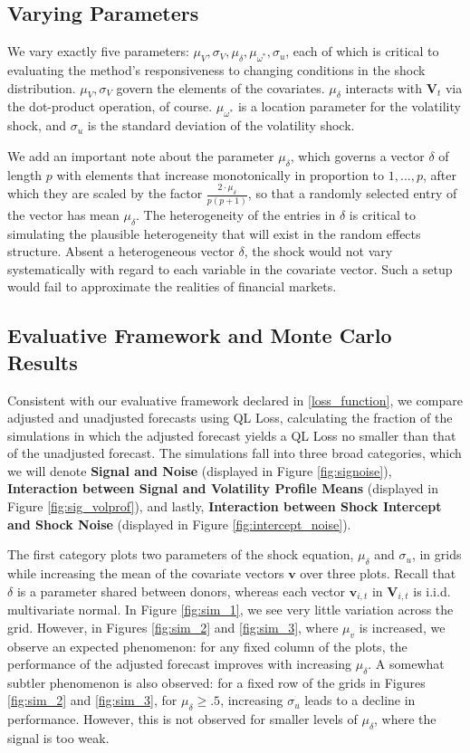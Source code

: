 \documentclass{uiucthesis2021}
\newcommand{\x}{\textbf{v}}
\newcommand{\V}{\textbf{V}}
\theoremstyle{definition}
\begin{document}
  \subsection{Varying Parameters}
  We vary exactly five parameters: $\mu_{V}, \sigma_{V}, \mu_{\delta}, \mu_{\omega^{*}}, \sigma_{u}$, each of which is critical to evaluating the method's responsiveness to changing conditions in the shock distribution. $\mu_{V}, \sigma_{V}$ govern the elements of the covariates. $\mu_{\delta}$ interacts with $\textbf{V}_{t}$ via the dot-product operation, of course.  $\mu_{\omega^{*}}$ is a location parameter for the volatility shock, and $\sigma_{u}$ is the standard deviation of the volatility shock.
  
  We add an important note about the parameter $\mu_{\delta}$, which governs a vector $\delta$ of length $p$ with elements that increase monotonically in proportion to $1,...,p$, after which they are scaled by the factor $\frac{2\cdot\mu_{\delta}}{p(p+1)}$, so that a randomly selected entry of the vector has mean $\mu_{\delta}$.  The heterogeneity of the entries in $\delta$ is critical to simulating the plausible heterogeneity that will exist in the random effects structure.  Absent a heterogeneous vector $\delta$, the shock would not vary systematically with regard to each variable in the covariate vector.  Such a setup would fail to approximate the realities of financial markets.

\subsection{Evaluative Framework and Monte Carlo Results}
Consistent with our evaluative framework declared in \ref{loss_function}, we compare adjusted and unadjusted forecasts using QL Loss, calculating the fraction of the simulations in which the adjusted forecast yields a QL Loss no smaller than that of the unadjusted forecast.  The simulations fall into three broad categories, which we will denote \textbf{Signal and Noise} (displayed in Figure \ref{fig:signoise}), \textbf{Interaction between Signal and Volatility Profile Means} (displayed in Figure \ref{fig:sig_volprof}), and lastly, \textbf{Interaction between Shock Intercept and Shock Noise} (displayed in Figure \ref{fig:intercept_noise}).  

The first category plots two parameters of the shock equation, $\mu_{\delta}$ and $\sigma_{u}$, in grids while increasing the mean of the covariate vectors $\x$ over three plots.  Recall that $\delta$ is a parameter shared between donors, whereas each vector $\x_{i,t}$ in $\V_{i,t}$ is i.i.d. multivariate normal.  In Figure \ref{fig:sim_1}, we see very little variation across the grid.  However, in Figures \ref{fig:sim_2} and \ref{fig:sim_3}, where $\mu_{v}$ is increased, we observe an expected phenomenon: for any fixed column of the plots, the performance of the adjusted forecast improves with increasing $\mu_{\delta}$.  A somewhat subtler phenomenon is also observed: for a fixed row of the grids in Figures \ref{fig:sim_2} and \ref{fig:sim_3}, for $\mu_{\delta} \geq .5$, increasing $\sigma_{u}$ leads to a decline in performance.  However, this is not observed for smaller levels of $\mu_{\delta}$, where the signal is too weak.
\end{document}
